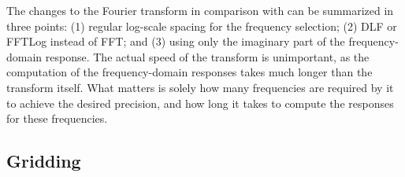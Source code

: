 \documentclass[extra, camera,%
    onecolumn,   %
    referee,     %
]{gji}
\begin{document}
The changes to the Fourier transform in comparison with \cite{GEO.08.Mulder}
can be summarized in three points: (1) regular log-scale spacing for the
frequency selection; (2) DLF or FFTLog instead of FFT; and (3) using only the
imaginary part of the frequency-domain response. The actual speed of the
transform is unimportant, as the computation of the frequency-domain responses
takes much longer than the transform itself. What matters is solely how many
frequencies are required by it to achieve the desired precision, and how long
it takes to compute the responses for these frequencies.

\subsection{Gridding}   %

\end{document}
